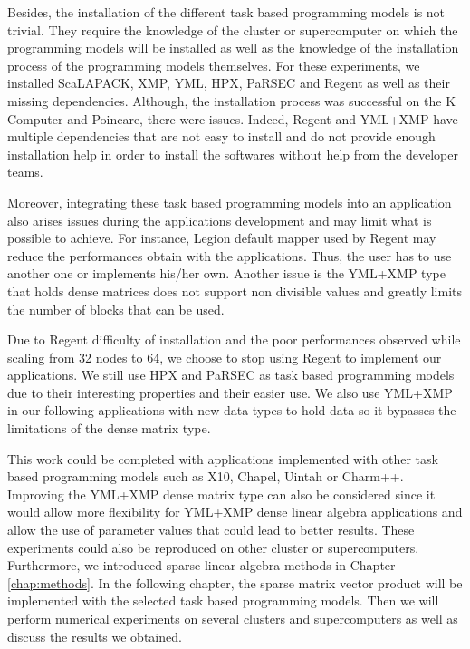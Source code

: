 Besides, the installation of the different task based programming models is not trivial.
They require the knowledge of the cluster or supercomputer on which the programming models will be installed as well as the knowledge of the installation process of the programming models themselves.
For these experiments, we installed ScaLAPACK, XMP, YML, HPX, PaRSEC and Regent as well as their missing dependencies.
Although, the installation process was successful on the K Computer and Poincare, there were issues.
Indeed, Regent and YML+XMP have multiple dependencies that are not easy to install and do not provide enough installation help in order to install the softwares without help from the developer teams.

Moreover, integrating these task based programming models into an application also arises issues during the applications development and may limit what is possible to achieve.
For instance, Legion default mapper used by Regent may reduce the performances obtain with the applications.
Thus, the user has to use another one or implements his/her own.
Another issue is the YML+XMP type that holds dense matrices does not support non divisible values and greatly limits the number of blocks that can be used.

Due to Regent difficulty of installation and the poor performances observed while scaling from 32 nodes to 64, we choose to stop using Regent to implement our applications.
We still use HPX and PaRSEC as task based programming models due to their interesting properties and their easier use.
We also use YML+XMP in our following applications with new data types to hold data so it bypasses the limitations of the dense matrix type.

This work could be completed with applications implemented with other task based programming models such as X10, Chapel, Uintah or Charm++.
Improving the YML+XMP dense matrix type can also be considered since it would allow more flexibility for YML+XMP dense linear algebra applications and allow the use of parameter values that could lead to better results.
These experiments could also be reproduced on other cluster or supercomputers.
Furthermore, we introduced sparse linear algebra methods in Chapter \ref{chap:methods}.
In the following chapter, the sparse matrix vector product will be implemented with the selected task based programming models.
Then we will perform numerical experiments on several clusters and supercomputers as well as discuss the results we obtained.


